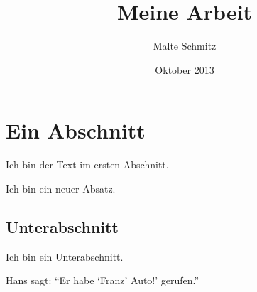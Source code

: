 \documentclass{scrartcl}
\author{Malte Schmitz}
\title{Meine Arbeit}
\date{Oktober 2013}
\begin{document}
  \maketitle

  \tableofcontents

  \section{Ein Abschnitt}

  Ich bin der Text im ersten Abschnitt.

  Ich bin ein neuer Absatz.

  \subsection{Unterabschnitt}

  Ich bin ein Unterabschnitt.

  Hans sagt: \enquote{Er habe \enquote{Franz' Auto!} gerufen.}
\end{document}
